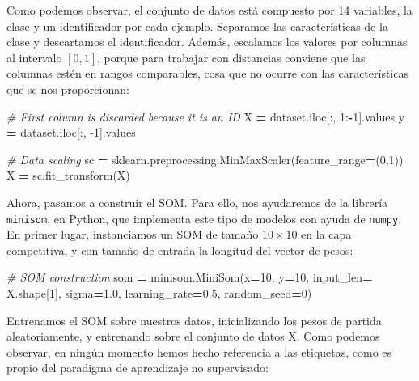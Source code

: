 \documentclass[
  a4paper,
,tablecaptionabove
]{scrartcl}
\newenvironment{Shaded}{\begin{snugshade}}{\end{snugshade}}
\newcommand{\CommentTok}[1]{\textcolor[rgb]{0.56,0.35,0.01}{\textit{#1}}}
\newcommand{\DecValTok}[1]{\textcolor[rgb]{0.00,0.00,0.81}{#1}}
\newcommand{\FloatTok}[1]{\textcolor[rgb]{0.00,0.00,0.81}{#1}}
\newcommand{\NormalTok}[1]{#1}
\newcommand{\OperatorTok}[1]{\textcolor[rgb]{0.81,0.36,0.00}{\textbf{#1}}}
\begin{document}
Como podemos observar, el conjunto de datos está compuesto por 14
variables, la clase y un identificador por cada ejemplo. Separamos las
características de la clase y descartamos el identificador. Además,
escalamos los valores por columnas al intervalo \([0,1]\), porque para
trabajar con distancias conviene que las columnas estén en rangos
comparables, cosa que no ocurre con las características que se nos
proporcionan:

\begin{Shaded}
\begin{Highlighting}[]
\CommentTok{# First column is discarded because it is an ID}
\NormalTok{X }\OperatorTok{=}\NormalTok{ dataset.iloc[:, }\DecValTok{1}\NormalTok{:}\OperatorTok{-}\DecValTok{1}\NormalTok{].values}
\NormalTok{y }\OperatorTok{=}\NormalTok{ dataset.iloc[:, }\DecValTok{-1}\NormalTok{].values}

\CommentTok{# Data scaling}
\NormalTok{sc }\OperatorTok{=}\NormalTok{ sklearn.preprocessing.MinMaxScaler(feature_range}\OperatorTok{=}\NormalTok{(}\DecValTok{0}\NormalTok{,}\DecValTok{1}\NormalTok{))}
\NormalTok{X }\OperatorTok{=}\NormalTok{ sc.fit_transform(X)}
\end{Highlighting}
\end{Shaded}

Ahora, pasamos a construir el SOM. Para ello, nos ayudaremos de la
librería \texttt{minisom}, en Python, que implementa este tipo de
modelos con ayuda de \texttt{numpy}. En primer lugar, instanciamos un
SOM de tamaño \(10 \times 10\) en la capa competitiva, y con tamaño de
entrada la longitud del vector de pesos:

\begin{Shaded}
\begin{Highlighting}[]
\CommentTok{# SOM construction}
\NormalTok{som }\OperatorTok{=}\NormalTok{ minisom.MiniSom(x}\OperatorTok{=}\DecValTok{10}\NormalTok{, y}\OperatorTok{=}\DecValTok{10}\NormalTok{, input_len}\OperatorTok{=}\NormalTok{ X.shape[}\DecValTok{1}\NormalTok{],}
\NormalTok{                      sigma}\OperatorTok{=}\FloatTok{1.0}\NormalTok{, learning_rate}\OperatorTok{=}\FloatTok{0.5}\NormalTok{, random_seed}\OperatorTok{=}\DecValTok{0}\NormalTok{)}
\end{Highlighting}
\end{Shaded}

Entrenamos el SOM sobre nuestros datos, inicializando los pesos de
partida aleatoriamente, y entrenando sobre el conjunto de datos X. Como
podemos observar, en ningún momento hemos hecho referencia a las
etiquetas, como es propio del paradigma de aprendizaje no supervisado:
\end{document}
